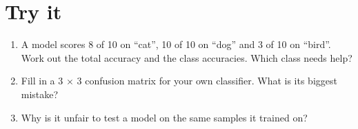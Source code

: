 \section{Try it}

\begin{enumerate}
\item A model scores 8 of 10 on “cat”, 10 of 10 on “dog” and 3 of 10 on “bird”. Work out the total accuracy and the class accuracies. Which class needs help?
\item Fill in a 3 \ensuremath{\times} 3 confusion matrix for your own classifier. What is its biggest mistake?
\item Why is it unfair to test a model on the same samples it trained on?
\end{enumerate}
